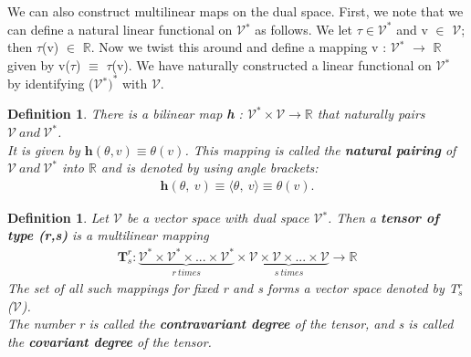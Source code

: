 \documentclass[12pt,a4paper]{article}
\newtheorem{defn}[thm]{Definition}
\begin{document}
We can also construct multilinear maps on the dual space. First, we note
that we can define a natural linear functional on $\mathcal{V}$$^*$ as follows. We let $\tau \in \mathcal{V}^* $
and v $\in$ $\mathcal{V}$; then $\tau$(v) $\in$ $\mathbb{R}$. Now we twist this around and define a mapping
v : $\mathcal{V}$$^*$ $\to$ $\mathbb{R}$ given by v($\tau$) $\equiv$ $\tau$(v). We have naturally constructed a linear functional on $\mathcal{V}$$^*$ by
identifying ($\mathcal{V}$$^*)^*$ with $\mathcal{V}$.
\begin{defn}
There is a bilinear map \textbf{h} : $\mathcal{V}^* \times \mathcal{V} \to \mathbb{R}$ that naturally pairs $\mathcal{V} \ and \ \mathcal{V}^*$.\\
It is given by $\textbf{h} (\theta, v) \equiv \theta(v)$. This mapping is called the \textbf{natural pairing} of $\mathcal{V} \ and 
\ \mathcal{V}^*$ into $\mathbb{R}$ and is denoted by using angle brackets:
\begin{align*}
\textbf{h}(\theta, \ v) \equiv \langle \theta, \  v \rangle \equiv \theta (v).
\end{align*}
\end{defn}
\begin{defn}
Let $\mathcal{V}$ be a vector space with dual space $\mathcal{V}$$^*$. Then a \textbf{tensor of type (r,s)} is a multilinear mapping
\begin{align*}
\textbf{T} ^r_s:\underbrace{\mathcal{V}^*\times \mathcal{V}^*\times ... \times \mathcal{V}^*}_{r\ times}\times\underbrace{\mathcal{V}\times \mathcal{V}\times...\times \mathcal{V}}_{s\ times} \to \mathbb{R}
\end{align*}
The set of all such mappings for fixed r and s forms a vector space denoted
by T$^r_s$ ($\mathcal{V}$). \\The number r is called the \textbf{contravariant degree} of the tensor,
and s is called the \textbf{covariant degree} of the tensor.\\\\
\end{defn}
\end{document}
